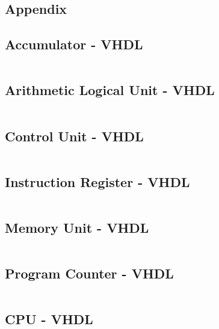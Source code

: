 \documentclass[12pt,a4paper,bibliography=totocnumbered,listof=totocnumbered]{scrartcl}
\begin{document}
\begin{appendix}
\section{Appendix}

\subsection{Accumulator - VHDL}
\inputminted[fontsize=\footnotesize, linenos, firstline=11]{vhdl}{../src/accumulator.vhd}

\pagebreak
\subsection{Arithmetic Logical Unit - VHDL}
\inputminted[fontsize=\footnotesize, linenos, firstline=11]{vhdl}{../src/arithmetic_logic_unit.vhd}

\pagebreak
\subsection{Control Unit - VHDL}
\inputminted[fontsize=\footnotesize, linenos, firstline=11]{vhdl}{../src/control_unit.vhd}

\pagebreak
\subsection{Instruction Register - VHDL}
\inputminted[fontsize=\footnotesize, linenos, firstline=11]{vhdl}{../src/instruction_register.vhd}

\pagebreak
\subsection{Memory Unit - VHDL}
\inputminted[fontsize=\footnotesize, linenos, firstline=11]{vhdl}{../src/memory_unit.vhd}

\pagebreak
\subsection{Program Counter - VHDL}
\inputminted[fontsize=\footnotesize, linenos, firstline=11]{vhdl}{../src/program_counter.vhd}

\pagebreak
\subsection{CPU - VHDL}
\inputminted[fontsize=\footnotesize, linenos, firstline=11]{vhdl}{../src/cpu.vhd}

\end{appendix}
\end{document}

